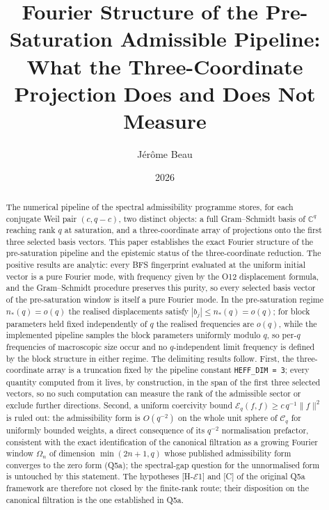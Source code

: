 \documentclass[11pt,a4paper]{article}
\theoremstyle{plain}
\theoremstyle{definition}
\newcommand{\C}{\mathbb{C}}
\newcommand{\Eq}{\mathcal{E}_q}
\newcommand{\Cq}{\mathcal{C}_q}
\begin{document}
  \title{Fourier Structure of the Pre-Saturation Admissible Pipeline:\\
  What the Three-Coordinate Projection Does and Does Not Measure}
  \author{J\'er\^ome Beau}
  \date{2026}
  \maketitle

  \begin{abstract}
    The numerical pipeline of the spectral admissibility programme stores, for each
    conjugate Weil pair $(c, q-c)$, two distinct objects: a full Gram--Schmidt basis of
    $\C^q$ reaching rank $q$ at saturation, and a three-coordinate array of projections
    onto the first three selected basis vectors.
    This paper establishes the exact Fourier structure of the pre-saturation pipeline and
    the epistemic status of the three-coordinate reduction.
    The positive results are analytic: every BFS fingerprint evaluated at the uniform
    initial vector is a pure Fourier mode, with frequency given by the O12 displacement
    formula, and the Gram--Schmidt procedure preserves this purity, so every selected
    basis vector of the pre-saturation window is itself a pure Fourier mode.
    In the pre-saturation regime $n_*(q) = o(q)$ the realised displacements satisfy
    $|b_j| \le n_*(q) = o(q)$; for block parameters held fixed independently of $q$ the
    realised frequencies are $o(q)$, while the implemented pipeline samples the block
    parameters uniformly modulo $q$, so per-$q$ frequencies of macroscopic size occur and
    no $q$-independent limit frequency is defined by the block structure in either regime.
    The delimiting results follow.
    First, the three-coordinate array is a truncation fixed by the pipeline constant
    \texttt{HEFF\_DIM = 3}; every quantity computed from it lives, by construction, in the
    span of the first three selected vectors, so no such computation can measure the rank
    of the admissible sector or exclude further directions.
    Second, a uniform coercivity bound $\Eq(f,f) \ge c\,q^{-1}\|f\|^2$ is ruled out: the
    admissibility form is $O(q^{-2})$ on the whole unit sphere of $\Cq$ for uniformly bounded
    weights, a direct consequence of its $q^{-2}$ normalisation prefactor, consistent with the exact
    identification of the canonical filtration as a growing Fourier window
    $\Omega_n$ of dimension $\min(2n+1, q)$ whose published admissibility form converges
    to the zero form (Q5a); the spectral-gap question for the unnormalised
    form is untouched by this statement.
    The hypotheses [H-$\mathcal{E}$1] and [C] of the original Q5a framework are therefore
    not closed by the finite-rank route; their disposition on the canonical filtration is
    the one established in Q5a.
  \end{abstract}
\end{document}
